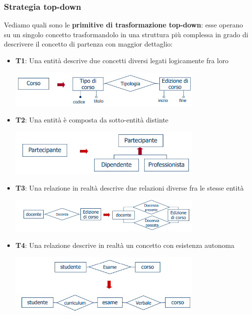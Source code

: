 \documentclass[12pt]{article}
\begin{document}
\subsubsection{Strategia top-down}
Vediamo quali sono le \textbf{primitive di trasformazione top-down}: esse operano su un singolo concetto trasformandolo in una struttura più complessa in grado di descrivere il concetto di partenza con maggior dettaglio:
\begin{itemize}
    \item \textbf{T1}: Una entità descrive due concetti diversi legati logicamente fra loro
    \begin{center}
        \includegraphics[width = 0.75\textwidth]{Images/57.PNG}
    \end{center}
    \item \textbf{T2}: Una entità è composta da sotto-entità distinte
    \begin{center}
        \includegraphics[width = 0.75\textwidth]{Images/58.PNG}
    \end{center}
    \item \textbf{T3}: Una relazione in realtà descrive due relazioni diverse fra le stesse entità
    \begin{center}
        \includegraphics[width = 0.75\textwidth]{Images/59.PNG}
    \end{center}
    \item \textbf{T4}: Una relazione descrive in realtà un concetto con esistenza autonoma
    \begin{center}
        \includegraphics[width = 0.75\textwidth]{Images/60.PNG}

\end{center}
\end{itemize}
\end{document}

